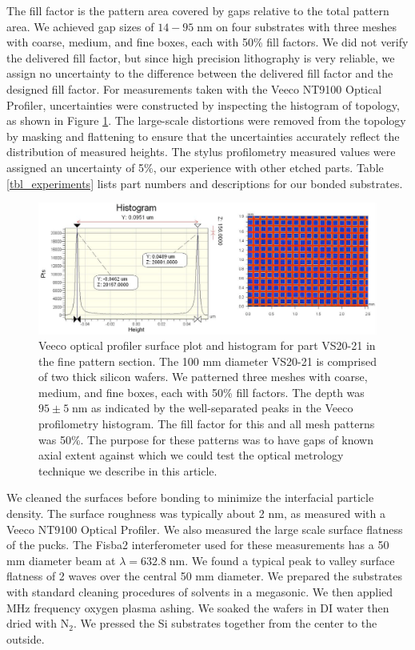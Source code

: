 \documentclass[osajnl,preprint,showpacs,superscriptaddress,12pt]{revtex4-1} %
\begin{document}
The fill factor is the pattern area covered by gaps relative to the total pattern area.  We achieved gap sizes of $14-95\;$nm on four substrates with three meshes with coarse, medium, and fine boxes, each with 50\% fill factors.  We did not verify the delivered fill factor, but since high precision lithography is very reliable, we assign no uncertainty to the difference between the delivered fill factor and the designed fill factor.  For measurements taken with the Veeco NT9100 Optical Profiler, uncertainties were constructed by inspecting the histogram of topology, as shown in Figure \ref{figVS20pattern}.  The large-scale distortions were removed from the topology by masking and flattening to ensure that the uncertainties accurately reflect the distribution of measured heights.  The stylus profilometry measured values were assigned an uncertainty of 5\%, our experience with other etched parts.  Table \ref{tbl_experiments} lists part numbers and descriptions for our bonded substrates.

\begin{figure}[htbp]
\includegraphics[width=1.0\columnwidth]{figs/VS20fineGapCrop.pdf}
\caption{
\label{figVS20pattern}
Veeco optical profiler surface plot and histogram for part VS20-21 in the fine pattern section.  The 100 mm diameter VS20-21 is comprised of two thick silicon wafers.  We patterned three meshes with coarse, medium, and fine boxes, each with 50\% fill factors.  The depth was $95 \pm 5\;$nm as indicated by the well-separated peaks in the Veeco profilometry histogram.  The fill factor for this and all mesh patterns was 50\%.  The purpose for these patterns was to have gaps of known axial extent against which we could test the optical metrology technique we describe in this article.}
\end{figure}





We cleaned the surfaces before bonding to minimize the interfacial particle density.  The surface roughness was typically about 2 nm, as measured with a Veeco NT9100 Optical Profiler.  We also measured the large scale surface flatness of the pucks.  The Fisba2 interferometer used for these measurements has a 50 mm diameter beam at $\lambda=632.8\;$nm.  We found a typical peak to valley surface flatness of 2 waves over the central 50 mm diameter.  We prepared the substrates with standard cleaning procedures of solvents in a megasonic.  We then applied MHz frequency oxygen plasma ashing.  We soaked the wafers in DI water then dried with N$_2$.  We pressed the Si substrates together from the center to the outside.
\end{document}
